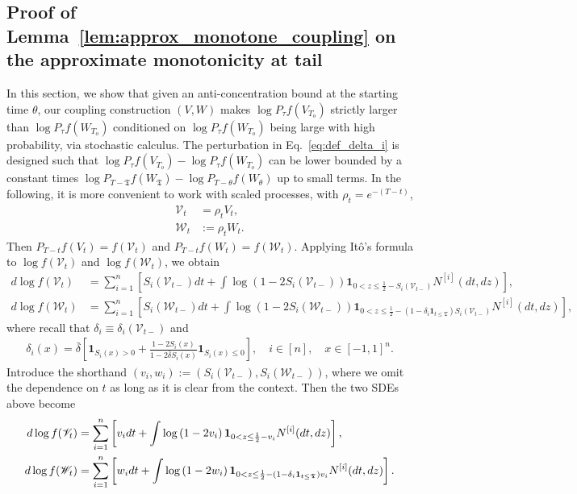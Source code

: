 \documentclass[11pt]{article}
\newcommand{\bdelta}{\bar{\delta}}
\newcommand{\stopT}{{\boldsymbol{\mathfrak{T}}}}
\newcommand{\uV}{V}
\newcommand{\uW}{W}
\newcommand{\To}{{T_o}}
\newcommand{\rV}{\mathscr{V}}
\newcommand{\rW}{\mathscr{W}}
\newcommand{\Ni}{N^{[i]}}
\theoremstyle{named}
\theoremstyle{plain}
\newcommand{\defn}{:=}
\newcommand{\brackets}[1]{\left[ #1 \right]}
\newcommand{\parenth}[1]{\left( #1 \right)}
\begin{document}
\subsection{Proof of Lemma~\ref{lem:approx_monotone_coupling} on the approximate monotonicity at tail}
\label{sub:proof_lem:approx_monotone_coupling}
In this section, we show that given an anti-concentration bound at the starting time $\theta$, our coupling construction $(\uV, \uW)$ makes $\log P_{\tau}f (\uV_{\To})$ strictly larger than $\log P_{\tau}f (\uW_{\To})$ conditioned on $\log P_{\tau}f (\uW_{\To})$ being large with high probability, via stochastic calculus. The perturbation in Eq.~\eqref{eq:def_delta_i} is designed such that $\log P_{\tau}f (\uV_{\To}) - \log P_{\tau}f (\uW_{\To})$ can be lower bounded by a constant times $\log P_{T-\stopT}f (\uW_{\stopT}) - \log P_{T-\theta}f (\uW_{\theta})$ up to small terms. In the following, it is more convenient to work with scaled processes, with $\rho_t = e^{-(T-t)}$,
\begin{align*}
  \rV_t &= \rho_t \uV_t, \\
  \rW_t &\defn \rho_t \uW_t.
\end{align*}
Then $P_{T-t}f (\uV_t) = f(\rV_t)$ and $P_{T-t}f (\uW_t) = f(\rW_t)$.
Applying It\^o's formula to $\log f(\rV_t)$ and $\log f(\rW_t)$, we obtain
\begin{align*}
  d \log f(\rV_t) &= \sum_{i=1}^n \brackets{S_i(\rV_{t-}) dt + \int \log \parenth{1-2S_i(\rV_{t-})} \mathbf{1}_{0 < z \leq \frac12 - S_i(\rV_{t-})} \Ni(dt, dz) }, \\
  d \log f(\rW_t) &= \sum_{i=1}^n \brackets{S_i(\rW_{t-}) dt + \int \log \parenth{1-2S_i(\rW_{t-})} \mathbf{1}_{0 < z \leq \frac12 - (1 - \delta_i \mathbf{1}_{t \leq \stopT})S_i(\rV_{t-})} \Ni(dt, dz) },
\end{align*}
where recall that $\delta_i \equiv \delta_i (\rV_{t-})$ and
\begin{align*}
  \delta_i(x) = \bdelta  \brackets{\mathbf{1}_{S_i(x) > 0} + \frac{1-2 S_i(x)}{1 - 2 \bdelta S_i(x)} \mathbf{1}_{S_i(x) \leq 0}}, \quad i \in [n],\quad x\in [-1,1]^n.
\end{align*}
Introduce the shorthand $(v_i, w_i) \defn (S_i(\rV_{t-}), S_i(\rW_{t-}))$, where we omit the dependence on $t$ as long as it is clear from the context. Then the two SDEs above become
\begin{align}
  \label{eq:logf_VW_simple_notation}
  d \log f(\rV_t) &= \sum_{i=1}^n \brackets{v_i dt + \int \log \parenth{1-2v_i} \mathbf{1}_{0 < z \leq \frac12 - v_i} \Ni(dt, dz) }, \notag \\
  d \log f(\rW_t) &= \sum_{i=1}^n \brackets{w_i dt + \int \log \parenth{1-2w_i} \mathbf{1}_{0 < z \leq \frac12 - (1 - \delta_i \mathbf{1}_{t \leq \stopT})v_i} \Ni(dt, dz)}.
\end{align}
\end{document}
